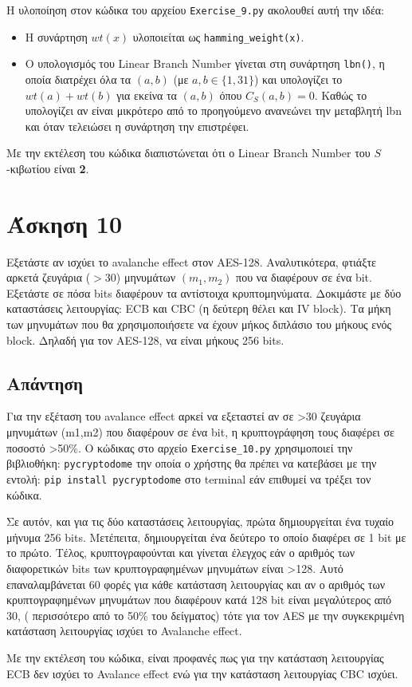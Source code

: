 \documentclass[12pt]{article}
\begin{document}
Η υλοποίηση στον κώδικα του αρχείου \texttt{Exercise\_9.py} ακολουθεί αυτή την ιδέα:
\begin{itemize}
    \item Η συνάρτηση \( wt(x) \) υλοποιείται ως \texttt{hamming\_weight(x)}.
    \item Ο υπολογισμός του Linear Branch Number γίνεται στη συνάρτηση \texttt{lbn()}, η οποία διατρέχει όλα τα \( (a,b) \) (με \( a,b \in \{1, 31\} \)) και υπολογίζει το \( wt(a) + wt(b) \) για εκείνα τα \( (a,b) \) όπου \( C_S(a,b)=0 \). Καθώς το υπολογίζει αν είναι μικρότερο από το προηγούμενο ανανεώνει την μεταβλητή lbn και όταν τελειώσει η συνάρτηση την επιστρέφει.
\end{itemize}

Με την εκτέλεση του κώδικα διαπιστώνεται ότι ο Linear Branch Number του \( S \)-κιβωτίου είναι \textbf{2}.
\hfill \blacksquare
\section*{Άσκηση 10}
Εξετάστε αν ισχύει το avalanche effect στον AES-128. Αναλυτικότερα, φτιάξτε αρκετά ζευγάρια (\(>30\)) μηνυμάτων \((m_1, m_2)\) που να διαφέρουν σε ένα bit. Εξετάστε σε πόσα bits διαφέρουν τα αντίστοιχα κρυπτομηνύματα. Δοκιμάστε με δύο καταστάσεις λειτουργίας: ECB και CBC (η δεύτερη θέλει και IV block). Τα μήκη των μηνυμάτων που θα χρησιμοποιήσετε να έχουν μήκος διπλάσιο του μήκους ενός block. Δηλαδή για τον AES-128, να είναι μήκους 256 bits.


\subsection*{Απάντηση}

Για την εξέταση του avalance effect αρκεί να εξεταστεί αν σε >30 ζευγάρια μηνυμάτων (m1,m2) που διαφέρουν σε ένα bit, η κρυπτογράφηση τους διαφέρει σε ποσοστό  >50\%. Ο κώδικας στο αρχείο \texttt{Exercise\_10.py} χρησιμοποιεί την βιβλιοθήκη: \texttt{pycryptodome} την οποία ο χρήστης θα πρέπει να κατεβάσει με την εντολή: \texttt{pip install pycryptodome} στο terminal εάν επιθυμεί να τρέξει τον κώδικα.
\newline
\newline

Σε αυτόν, και για τις δύο καταστάσεις λειτουργίας, πρώτα δημιουργείται ένα τυχαίο μήνυμα 256 bits. Μετέπειτα, δημιουργείται ένα δεύτερο το οποίο διαφέρει σε 1 bit με το πρώτο. Τέλος, κρυπτογραφούνται  και γίνεται έλεγχος εάν ο αριθμός των διαφορετικών bits των κρυπτογραφημένων μηνυμάτων είναι >128. Αυτό επαναλαμβάνεται 60 φορές για κάθε κατάσταση λειτουργίας και αν ο αριθμός των κρυπτογραφημένων μηνυμάτων που διαφέρουν κατά 128 bit είναι μεγαλύτερος από 30, ( περισσότερο από το 50\% του δείγματος) τότε για τον AES με την συγκεκριμένη κατάσταση λειτουργίας ισχύει το Avalanche effect.
\newline
\newline

Με την εκτέλεση του κώδικα, είναι προφανές πως για την κατάσταση λειτουργίας ECB δεν ισχύει το Avalance effect ενώ για την κατάσταση λειτουργίας CBC ισχύει.
\hfill \blacksquare
\end{document}

